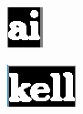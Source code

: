 \documentclass[english, paper=a4]{scrartcl}
\begin{document}
\begin{figure}
	\centering
	\begin{subfigure}{0.2\textwidth}
		\includegraphics[width=\textwidth]{mergedChars1.PNG}
		\label{fig:ex2a}
	\end{subfigure}
	\begin{subfigure}{0.30\textwidth}
		\includegraphics[width=\textwidth]{mergedChars2.PNG}
		\label{fig:ex2b}
	\end{subfigure}

\end{figure}
\end{document}
